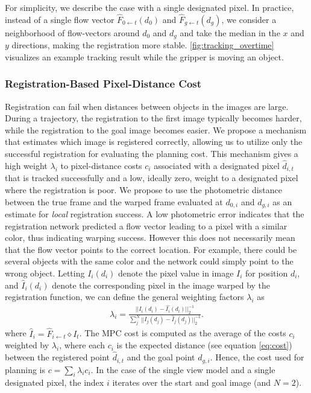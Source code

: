 For simplicity, we describe the case with a single designated pixel. In practice, instead of a single flow vector $\hat{F}_{0 \leftarrow t}(d_0)$ and $\hat{F}_{g \leftarrow t}(d_g)$, we consider a neighborhood of flow-vectors around $d_0$ and $d_g$ and take the median in the $x$ and $y$ directions, making the registration more stable.
\autoref{fig:tracking_overtime} visualizes an example tracking result while the gripper is moving an object.

\subsubsection{Registration-Based Pixel-Distance Cost}
\label{subsec:planning_costs}

Registration can fail when distances between objects in the images are large. During a trajectory, the registration to the first image typically becomes harder, while the registration to the goal image becomes easier. We propose a mechanism that estimates which image is registered correctly, allowing us to utilize only the successful registration for evaluating the planning cost. This mechanism gives a high weight $\lambda_i$ to pixel-distance costs $c_i$ associated with a designated pixel $\hat{d}_{i,t}$ that is tracked successfully and a low, ideally zero, weight to a designated pixel where the registration is poor. We propose to use the photometric distance between the true frame and the warped frame evaluated at $d_{0,i}$ and $d_{g,i}$ as an estimate for \emph{local} registration success. A low photometric error indicates that the registration network predicted a flow vector leading to a pixel with a similar color, thus indicating warping success. However this does not necessarily mean that the flow vector points to the correct location. For example, there could be several objects with the same color and the network could simply point to the wrong object. Letting $I_i(d_i)$ denote the pixel value in image $I_i$ for position $d_i$, and $\hat{I}_i(d_i)$ denote the corresponding pixel in the image warped by the registration function, we can define the general weighting factors $\lambda_i$ as
\begin{align}
\lambda_i =  \frac{||I_i(d_i) - \hat{I_i}(d_i)||_2^{-1}}{\sum^N_j ||I_j(d_j) - \hat{I}_j(d_j)||^{-1}_2}.
\label{eqn:cost_avg}
\end{align}
where $\hat{I}_i = \hat{F}_{i \leftarrow t} \diamond I_t$. The MPC cost is computed as the average of the costs $c_i$ weighted by $\lambda_i$, where each $c_i$ is the expected distance (see equation \ref{eq:cost}) between the registered point $\hat{d}_{i,t}$ and the goal point $d_{g,i}$. Hence, the cost used for planning is $c = \sum_i \lambda_i c_i$.  In the case of the single view model and a single designated pixel, the index $i$ iterates over the start and goal image (and $N=2$).

